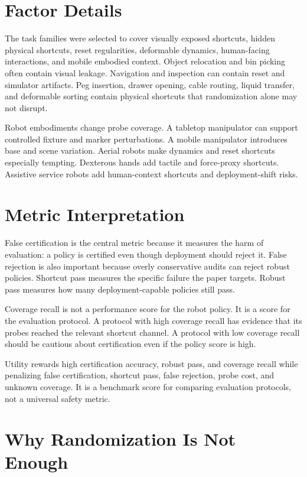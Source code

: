 \documentclass{article}
\begin{document}
\clearpage
\appendix

\section{Factor Details}

The task families were selected to cover visually exposed shortcuts, hidden physical shortcuts, reset regularities, deformable dynamics, human-facing interactions, and mobile embodied context. Object relocation and bin picking often contain visual leakage. Navigation and inspection can contain reset and simulator artifacts. Peg insertion, drawer opening, cable routing, liquid transfer, and deformable sorting contain physical shortcuts that randomization alone may not disrupt.

Robot embodiments change probe coverage. A tabletop manipulator can support controlled fixture and marker perturbations. A mobile manipulator introduces base and scene variation. Aerial robots make dynamics and reset shortcuts especially tempting. Dexterous hands add tactile and force-proxy shortcuts. Assistive service robots add human-context shortcuts and deployment-shift risks.

\clearpage
\section{Metric Interpretation}

False certification is the central metric because it measures the harm of evaluation: a policy is certified even though deployment should reject it. False rejection is also important because overly conservative audits can reject robust policies. Shortcut pass measures the specific failure the paper targets. Robust pass measures how many deployment-capable policies still pass.

Coverage recall is not a performance score for the robot policy. It is a score for the evaluation protocol. A protocol with high coverage recall has evidence that its probes reached the relevant shortcut channel. A protocol with low coverage recall should be cautious about certification even if the policy score is high.

Utility rewards high certification accuracy, robust pass, and coverage recall while penalizing false certification, shortcut pass, false rejection, probe cost, and unknown coverage. It is a benchmark score for comparing evaluation protocols, not a universal safety metric.

\clearpage
\section{Why Randomization Is Not Enough}
\end{document}
